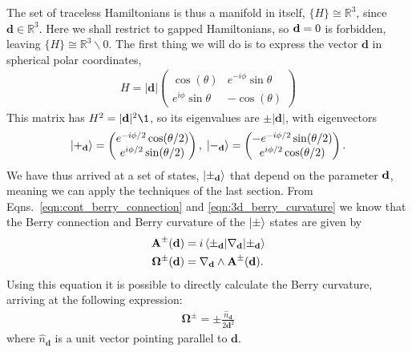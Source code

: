 The set of traceless Hamiltonians is thus a manifold in itself, $ \{H\} \cong \mathbb{R}^3 $, since $\textbf{d} \in \mathbb{R}^3 $. Here we shall restrict to gapped Hamiltonians, so $\textbf d = 0$ is forbidden, leaving $ \{H\} \cong \mathbb{R}^3\backslash 0$. The first thing we will do is to express the vector $\textbf{d}$ in spherical polar coordinates,
\begin{align}
    H = |\textbf{d}|\begin{pmatrix}
\cos(\theta) &e^{-i\phi}\sin{\theta} \\ 
 e^{i\phi}\sin{\theta}& -\cos(\theta)
\end{pmatrix}
\end{align}
This matrix has $H^2 = |\textbf{d}|^2 \1 $, so its eigenvalues are $\pm |\textbf{d}|$, with eigenvectors
\begin{align}\label{states}
    \ket{+_{\textbf{d}}} = \begin{pmatrix}
e^{-i\phi/2}\cos(\theta/2)\\ 
e^{i\phi/2} \sin(\theta/2)
\end{pmatrix},\; \ket{-_{\textbf{d}}} = \begin{pmatrix}
-e^{-i\phi/2}\sin(\theta/2)\\ 
e^{i\phi/2} \cos(\theta/2)
\end{pmatrix}.
\end{align}
We have thus arrived at a set of states, $\ket {\pm_{\textbf d}}$ that depend on the parameter $\textbf d$, meaning we can apply the techniques of the last section. From Eqns.~\ref{eqn:cont_berry_connection} and \ref{eqn:3d_berry_curvature} we know that the Berry connection and Berry curvature of the $\ket \pm$ states are given by
\begin{align}
    \textbf{A}^\pm (\textbf d) &= i\braket{\pm_\textbf{d} | \nabla_\textbf{d}| \pm_\textbf{d}}\\
    \bm \Omega^{\pm}(\textbf d ) &= \nabla_\textbf{d} \wedge \textbf{A}^\pm (\textbf d).
\end{align}
Using this equation it is possible to directly calculate the Berry curvature, arriving at the following expression:
\begin{align}
    \bm \Omega^{\pm} = \pm \frac{\hat{n}_\textbf{d}}{2\textbf{d}^2}
\end{align}
where $\hat{n}_\textbf{d}$ is a unit vector pointing parallel to $\textbf{d}$.


